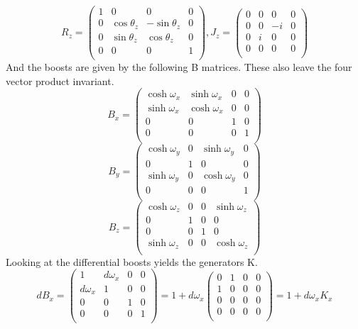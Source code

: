 \begin{equation}
R_z = 
\begin{pmatrix}
1 & 0 & 0 & 0\\
0 & \cos\theta_z & -\sin\theta_z & 0 \\
0 & \sin\theta_z & \cos\theta_z & 0 \\
0 & 0 & 0 & 1 \\
\end{pmatrix},
J_z = 
\begin{pmatrix}
0 & 0 & 0 & 0\\
0 & 0 & -i & 0 \\
0 & i & 0 & 0 \\
0 & 0 & 0 & 0 \\
\end{pmatrix}
\end{equation}
And the boosts are given by the following B matrices. These also leave the four vector product invariant.
\begin{equation}
B_x = 
\begin{pmatrix}
\cosh\omega_x & \sinh\omega_x & 0 & 0 \\
\sinh\omega_x & \cosh\omega_x & 0 & 0 \\
0 & 0 & 1 & 0 \\
0 & 0 & 0 & 1 \\
\end{pmatrix}
\end{equation}
\begin{equation}
B_y = 
\begin{pmatrix}
\cosh\omega_y & 0 & \sinh\omega_y & 0 \\
0 & 1 & 0 & 0 \\
\sinh\omega_y & 0 & \cosh\omega_y & 0 \\
0 & 0 & 0 & 1 \\
\end{pmatrix}
\end{equation}
\begin{equation}
B_z = 
\begin{pmatrix}
\cosh\omega_z & 0 & 0 & \sinh\omega_z \\
0 & 1 & 0 & 0 \\
0 & 0 & 1 & 0 \\
\sinh\omega_z & 0 & 0 & \cosh\omega_z \\
\end{pmatrix}
\end{equation}
Looking at the differential boosts yields the generators K.
\begin{equation}
dB_x = 
\begin{pmatrix}
1 & d\omega_x & 0 & 0 \\
d\omega_x & 1 & 0 & 0 \\
0 & 0 & 1 & 0 \\
0 & 0 & 0 & 1 \\
\end{pmatrix}
= 1 + d\omega_x 
\begin{pmatrix}
0 & 1 & 0 & 0 \\
1 & 0 & 0 & 0 \\
0 & 0 & 0 & 0 \\
0 & 0 & 0 & 0 \\
\end{pmatrix}
= 1 + d\omega_x K_x
\end{equation}
